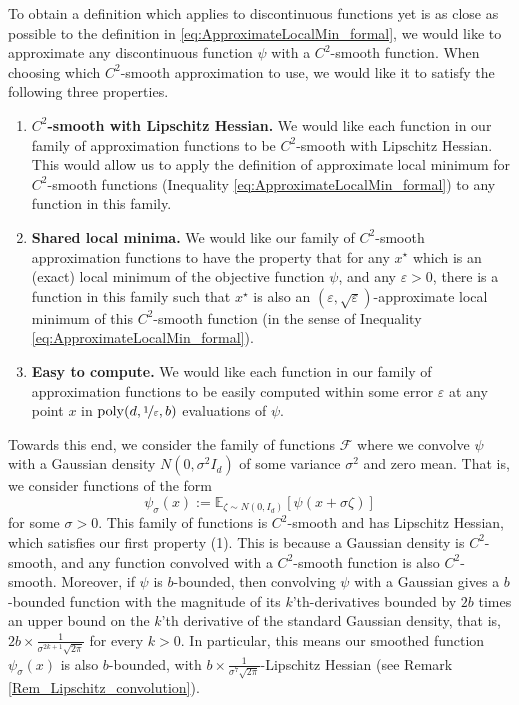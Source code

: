 \documentclass[11pt,letterpaper]{article}
\renewcommand{\epsilon}{\varepsilon}
\newcommand{\eps}{\varepsilon}
\begin{document}
To obtain a definition which applies to discontinuous functions yet is as close as possible to the definition in \eqref{eq:ApproximateLocalMin_formal}, we would like to approximate any discontinuous function $\psi$ with a $C^2$-smooth function.%
%
 When choosing which $C^2$-smooth approximation to use, we would like it to satisfy the following three properties.
%
\begin{enumerate}
\item {\bf $C^2$-smooth with Lipschitz Hessian.} We would like each function in our family of approximation functions to be $C^2$-smooth with Lipschitz Hessian.  This would allow us to apply the definition of approximate local minimum for $C^2$-smooth functions (Inequality \eqref{eq:ApproximateLocalMin_formal}) to any function in this family.
%
\item {\bf Shared local minima.} We would like our family of $C^2$-smooth approximation functions to have the property that for any $x^\star$ which is an (exact) local minimum of the objective function $\psi$, and any $\epsilon>0$, there is a function in this family such that $x^\star$ is also an $(\epsilon, \sqrt{\eps})$-approximate local minimum of this $C^2$-smooth function (in the sense of Inequality \eqref{eq:ApproximateLocalMin_formal}).
%
\item {\bf Easy to compute.} We would like each function in our family of approximation functions to be easily computed within some error $\epsilon$ at any point $x$ in $\mathrm{poly}(d,\nicefrac{1}{\epsilon}, b)$  evaluations of $\psi$.
%
\end{enumerate}
 
 \noindent
Towards this end, we consider the family of functions $\mathcal{F}$ where we convolve $\psi$ with a Gaussian density $N(0, \sigma^2 I_d)$ of some variance $\sigma^2$ and zero mean. 
%
 That is, we consider functions of the form $$\psi_\sigma(x) := \mathbb{E}_{\zeta \sim N(0,I_d)}\left [\psi(x  + \sigma \zeta) \right]$$ for some $\sigma>0$. 
  This family of functions is $C^2$-smooth and has Lipschitz Hessian, which satisfies our first property (1). 
  This is because a Gaussian density is $C^2$-smooth, and any function convolved with a $C^2$-smooth function is also $C^2$-smooth. 
% 
    Moreover, if $\psi$ is $b$-bounded, then convolving $\psi$ with a Gaussian  gives a $b$-bounded function with the magnitude of its $k$'th-derivatives bounded by $2b$ times an upper bound on the $k$'th derivative of the standard Gaussian density, that is, $2b \times \frac{1}{\sigma^{2k+1} \sqrt{2 \pi}}$ for every $k>0$. 
     In particular, this means our smoothed function $\psi_\sigma(x)$ is also $b$-bounded, with $b \times \frac{1}{\sigma^{7} \sqrt{2 \pi}}$-Lipschitz Hessian (see Remark \ref{Rem_Lipschitz_convolution}).
\end{document}
